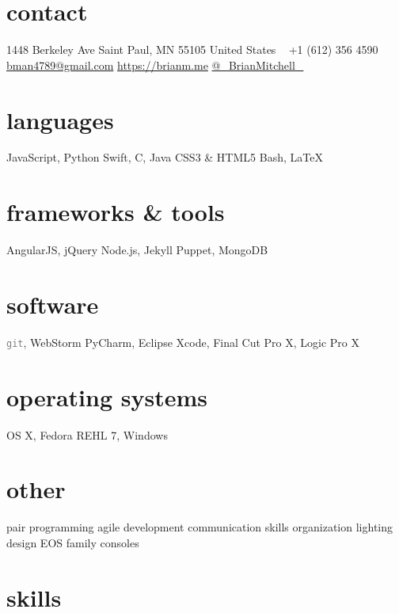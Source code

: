 \documentclass[]{cv-style} %
\begin{document}
\lastupdated


\begin{aside} %
\section{contact}
1448 Berkeley Ave
Saint Paul, MN 55105
United States
~
+1 (612) 356 4590
~
\href{mailto:bman4789@gmail.com}{bman4789@gmail.com}
\href{https://brianm.me}{https://brianm.me}
\href{https://twitter.com/_BrianMitchell_}{@\_BrianMitchell\_}
\section{languages}
JavaScript, Python
Swift, C, Java
CSS3 \& HTML5
Bash, \LaTeX
\section{frameworks \& tools}
AngularJS, jQuery
Node.js, Jekyll
Puppet, MongoDB
\section{software}
\textcolor{gray}{\texttt{git}}, WebStorm
PyCharm, Eclipse
Xcode, Final Cut Pro X,
Logic Pro X
\section{operating systems}
OS X, Fedora
REHL 7, Windows
\section{other}
pair programming
agile development
communication skills
organization
lighting design
EOS family consoles
\end{aside}


\section{skills}
  \vspace{-0.2cm}
\end{document}
